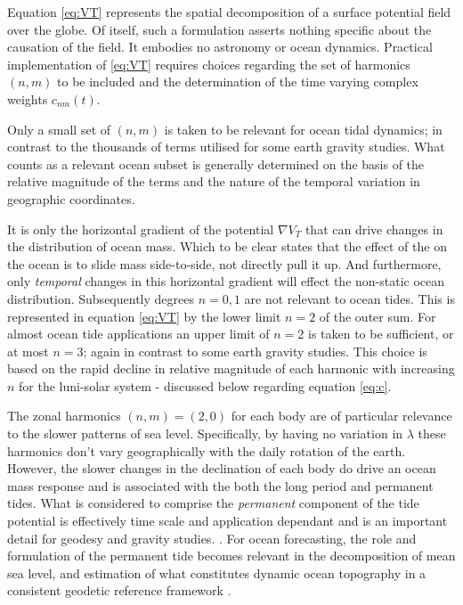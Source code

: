 Equation \ref{eq:VT} represents the spatial decomposition of a surface potential field over the globe.  Of itself, such a formulation asserts nothing specific about the causation of the field.  It embodies no astronomy or ocean dynamics.
Practical implementation of \ref{eq:VT} requires choices regarding the set of harmonics $(n,m)$ to be included and the determination of the time varying complex weights $c_{nm}(t)$.


Only a small set of $(n,m)$ is taken to be relevant for ocean tidal dynamics; in contrast to the thousands of terms utilised for some earth gravity studies. What counts as a relevant ocean subset is generally determined on the basis of the relative magnitude of the terms and the nature of the temporal variation in geographic coordinates.

It is only the horizontal gradient of the potential $\nabla V_T$ that can drive changes in the distribution of ocean mass.   Which to be clear states that the effect of the \ATGP{} on the ocean is to slide mass side-to-side, not directly pull it up.   And furthermore, only \emph{temporal} changes in this horizontal gradient will effect the non-static ocean distribution. Subsequently degrees $n=0,1$ are not relevant to ocean tides.   This is represented in equation \ref{eq:VT} by the lower limit $n=2$ of the outer sum.
For almost ocean tide applications an upper limit of $n=2$ is taken to be sufficient, or at most $n=3$; again in contrast to some earth gravity studies.  This choice is based on the rapid decline in relative magnitude of each harmonic with increasing $n$ for the luni-solar system - discussed below regarding equation \ref{eq:c}.



The zonal harmonics $(n,m) = (2,0)$ for each body are of particular relevance to the slower patterns of sea level.  Specifically, by having no variation in $\lambda$ these harmonics don't vary geographically with the daily rotation of the earth.   However, the slower changes in the declination of each body do drive an ocean mass response and is associated with the both the long period and permanent tides.  
What is considered to comprise the \emph{permanent} component of the tide potential is effectively time scale and application dependant and is an important detail for geodesy and gravity studies.  \cite[section 5.3.3.2]{Urban:2013vl}.  For ocean forecasting, the role and formulation of the permanent tide becomes relevant in the decomposition of mean sea level, and estimation of what constitutes dynamic ocean topography in a consistent geodetic reference framework \citep{Filmer:2018cu}\cite{10.1007/bf02520477}.


